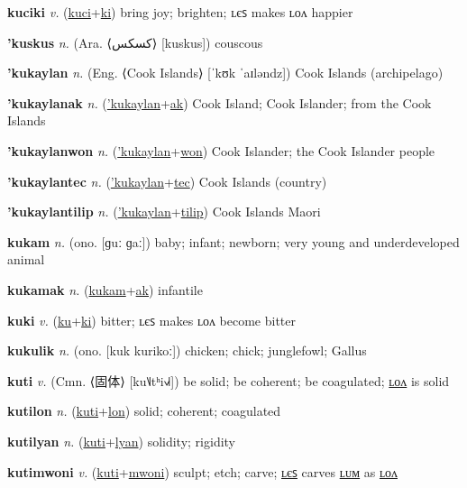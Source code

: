 \textbf{\hypertarget{kuciki}{kuciki}} \textit{v.} (\hyperlink{kuci}{kuci}+\allowbreak \hyperlink{ki}{ki})
bring joy; brighten; ʟєꜱ makes ʟᴏᴧ happier

\textbf{\hypertarget{'kuskus}{'kuskus}} \textit{n.} (Ara. ⟨{\arabics{}كسكس}⟩ [kuskus])
couscous

\textbf{\hypertarget{'kukaylan}{'kukaylan}} \textit{n.} (Eng. ⟨Cook Islands⟩ [ˈkʊk ˈaɪləndz])
Cook Islands (archipelago)

\textbf{\hypertarget{'kukaylanak}{'kukaylanak}} \textit{n.} (\hyperlink{'kukaylan}{'kukaylan}+\allowbreak \hyperlink{ak}{ak})
Cook Island; Cook Islander; from the Cook Islands

\textbf{\hypertarget{'kukaylanwon}{'kukaylanwon}} \textit{n.} (\hyperlink{'kukaylan}{'kukaylan}+\allowbreak \hyperlink{won}{won})
Cook Islander; the Cook Islander people

\textbf{\hypertarget{'kukaylantec}{'kukaylantec}} \textit{n.} (\hyperlink{'kukaylan}{'kukaylan}+\allowbreak \hyperlink{tec}{tec})
Cook Islands (country)

\textbf{\hypertarget{'kukaylantilip}{'kukaylantilip}} \textit{n.} (\hyperlink{'kukaylan}{'kukaylan}+\allowbreak \hyperlink{tilip}{tilip})
Cook Islands Maori

\textbf{\hypertarget{kukam}{kukam}} \textit{n.} (ono. [ɡuː ɡaː])
baby; infant; newborn; very young and underdeveloped animal

\textbf{\hypertarget{kukamak}{kukamak}} \textit{n.} (\hyperlink{kukam}{kukam}+\allowbreak \hyperlink{ak}{ak})
infantile

\textbf{\hypertarget{kuki}{kuki}} \textit{v.} (\hyperlink{ku}{ku}+\allowbreak \hyperlink{ki}{ki})
bitter; ʟєꜱ makes ʟᴏᴧ become bitter

\textbf{\hypertarget{kukulik}{kukulik}} \textit{n.} (ono. [kuk kurikoː])
chicken; chick; junglefowl; Gallus

\textbf{\hypertarget{kuti}{kuti}} \textit{v.} (Cmn. ⟨{\chinese{}固体}⟩ [ku˥˩tʰi˧˩˧])
be solid; be coherent; be coagulated; \hyperlink{kutilon}{ʟᴏᴧ} is solid

\textbf{\hypertarget{kutilon}{kutilon}} \textit{n.} (\hyperlink{kuti}{kuti}+\allowbreak \hyperlink{lon}{lon})
solid; coherent; coagulated

\textbf{\hypertarget{kutilyan}{kutilyan}} \textit{n.} (\hyperlink{kuti}{kuti}+\allowbreak \hyperlink{lyan}{lyan})
solidity; rigidity

\textbf{\hypertarget{kutimwoni}{kutimwoni}} \textit{v.} (\hyperlink{kuti}{kuti}+\allowbreak \hyperlink{mwoni}{mwoni})
sculpt; etch; carve; \hyperlink{kutimwoniles}{ʟєꜱ} carves \hyperlink{kutimwonilum}{ʟᴜᴍ} as \hyperlink{kutimwonilon}{ʟᴏᴧ}

